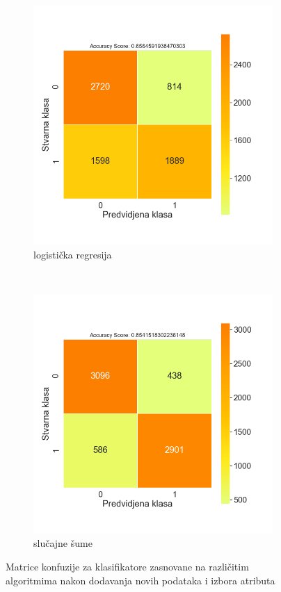 \documentclass[12pt,oneside]{memoir}
\begin{document}
\begin{figure}[!ht]
\begin{subfigure}[b]{0.45\textwidth}
        \includegraphics[width=\textwidth]{LR_feature_selection_oversampling_confussion_matrix}
        \caption{logistička regresija}
        \label{fig:logreg4}
    \end{subfigure}
    \\
    \begin{subfigure}[b]{0.45\textwidth}
        \centering
        \includegraphics[width=\textwidth]{RF_feature_selection_oversampled_confussion_matrix}
        \caption{slučajne šume}
        \label{fig:randfor4}
    \end{subfigure}
    \caption{Matrice konfuzije za klasifikatore zasnovane na različitim algoritmima nakon dodavanja novih podataka i izbora atributa}
    \label{fig:confmatroversfeatsel}
\end{figure}
\end{document}
